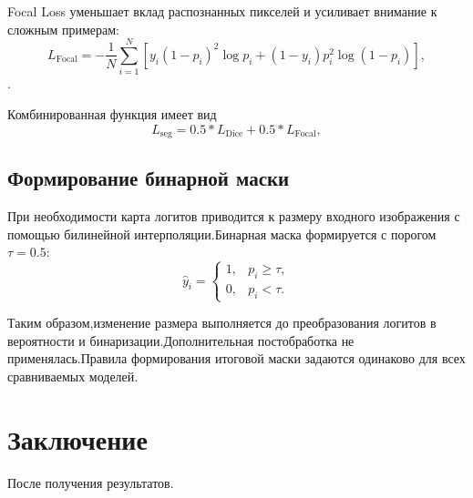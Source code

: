 \documentclass{misisarticle}
\begin{document}
	Focal Loss уменьшает вклад распознанных пикселей и усиливает внимание к сложным примерам:
	\[
	L_{\mathrm{Focal}}
	=-\frac{1}{N}\sum_{i=1}^{N}\left[
	y_i(1-p_i)^2 \log p_i+
	(1-y_i)p_i^2\log(1-p_i)\right],
	\].
	
	Комбинированная функция имеет вид
	\[
	L_{\mathrm{seg}}
	=0.5*L_{\mathrm{Dice}}+
	0.5*L_{\mathrm{Focal}},
	\]

	\subsection{Формирование бинарной маски}
	
	При необходимости карта логитов приводится к размеру входного изображения с помощью билинейной интерполяции.Бинарная маска формируется с порогом $\tau = 0.5$:
	\[
	\hat{y}_i =
	\begin{cases}
		1, & p_i \geq \tau,\\
		0, & p_i < \tau.
	\end{cases}
	\]
	
	Таким образом,изменение размера выполняется до преобразования логитов в вероятности и бинаризации.Дополнительная постобработка не применялась.Правила формирования итоговой маски задаются одинаково для всех сравниваемых моделей.
	
	\section{Заключение}
	
	После получения результатов.
	
\end{document}
